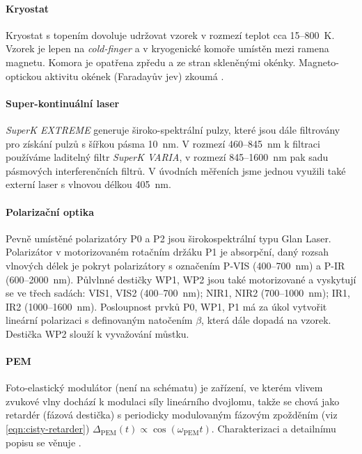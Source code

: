 \paragraph{Kryostat}
Kryostat s topením dovoluje udržovat vzorek v rozmezí teplot cca 15--\SI{800}{\kelvin}.
Vzorek je lepen na \emph{cold-finger} a v kryogenické komoře umístěn mezi ramena magnetu.
Komora je opatřena zpředu a ze stran skleněnými okénky.
Magneto-optickou aktivitu okének (Faradayův jev) zkoumá \cite{baduraMagnetooptickaMereniPro2019}.

\paragraph{Super-kontinuální laser}
\emph{SuperK EXTREME} generuje široko-spektrální pulzy, které jsou dále filtrovány pro získání pulzů s šířkou pásma \SI{10}{\nano\meter}.
V rozmezí \num{460}--\SI{845}{\nano\meter} k filtraci používáme laditelný filtr \emph{SuperK VARIA}, v rozmezí \num{845}--\SI{1600}{\nano\meter} pak sadu pásmových interferenčních filtrů.
V úvodních měřeních jsme jednou využili také externí laser s vlnovou délkou \SI{405}{\nano\meter}.

\paragraph{Polarizační optika}
Pevně umístěné polarizatóry P0 a P2 jsou širokospektrální typu Glan Laser.
Polarizátor v motorizovaném rotačním držáku P1 je absorpční, daný rozsah vlnových délek je pokryt polarizátory s označením P-VIS (\num{400}--\SI{700}{\nano\meter}) a P-IR (\num{600}--\SI{2000}{\nano\meter}).
Půlvlnné destičky WP1, WP2 jsou také motorizované a vyskytují se ve třech sadách: VIS1, VIS2 (\num{400}--\SI{700}{\nano\meter}); NIR1, NIR2 (\num{700}--\SI{1000}{\nano\meter}); IR1, IR2 (\num{1000}--\SI{1600}{\nano\meter}).
Posloupnost prvků P0, WP1, P1 má za úkol vytvořit lineární polarizaci s definovaným natočením $\beta$, která dále dopadá na vzorek.
Destička WP2 slouží k vyvažování můstku.

\paragraph{PEM}
Foto-elastický modulátor (není na schématu) je zařízení, ve kterém vlivem zvukové vlny dochází k modulaci síly lineárního dvojlomu,
takže se chová jako retardér (fázová destička) s periodicky modulovaným fázovým zpožděním (viz \eqref{eqn:cisty-retarder}) $\Delta_\textrm{PEM}(t) \propto \cos(\omega_\textrm{PEM}t)$. 
Charakterizaci a detailnímu popisu se věnuje \cite{minarModulacePolarizaceSvetelne2004}.

